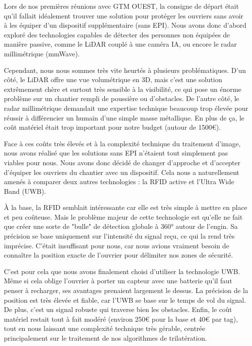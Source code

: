 Lors de nos premières réunions avec GTM OUEST, la consigne de départ était qu'il fallait idéalement trouver une solution pour protéger les ouvriers sans avoir à les équiper d'un dispositif supplémentaire (sans EPI). Nous avons donc d'abord exploré des technologies capables de détecter des personnes non équipées de manière passive, comme le LiDAR couplé à une caméra IA, ou encore le radar millimétrique (mmWave).


Cependant, nous nous sommes très vite heurtés à plusieurs problématiques. D'un côté, le LiDAR offre une vue volumétrique en 3D, mais c'est une solution extrêmement chère et surtout très sensible à la visibilité, ce qui pose un énorme problème sur un chantier rempli de poussière ou d'obstacles. De l'autre côté, le radar millimétrique demandait une expertise technique beaucoup trop élevée pour réussir à différencier un humain d'une simple masse métallique. En plus de ça, le coût matériel était trop important pour notre budget (autour de 1500€).


Face à ces coûts très élevés et à la complexité technique du traitement d'image, nous avons réalisé que les solutions sans EPI n'étaient tout simplement pas viables pour nous. Nous avons donc décidé de changer d'approche et d'accepter d'équiper les ouvriers du chantier avec un dispositif. Cela nous a naturellement amenés à comparer deux autres technologies : la RFID active et l'Ultra Wide Band (UWB).


À la base, la RFID semblait intéressante car elle est très simple à mettre en place et peu coûteuse. Mais le problème majeur de cette technologie est qu'elle ne fait que créer une sorte de "bulle" de détection globale à 360° autour de l'engin. Sa précision se base uniquement sur l'intensité du signal reçu, ce qui la rend très imprécise. C'était insuffisant pour nous, car nous avions vraiment besoin de connaître la position exacte de l'ouvrier pour délimiter nos zones de sécurité.


C'est pour cela que nous avons finalement choisi d'utiliser la technologie UWB. Même si cela oblige l'ouvrier à porter un capteur avec une batterie qu'il faut penser à recharger, ses avantages prenaient largement le dessus. La précision de la position est très élevée et fiable, car l'UWB se base sur le temps de vol du signal. De plus, c'est un signal robuste qui traverse bien les obstacles. Enfin, le coût matériel restait tout à fait modéré (environ 250€ pour la base et 40€ par tag), tout en nous laissant une complexité technique très gérable, centrée principalement sur le traitement de nos algorithmes de trilatération.

